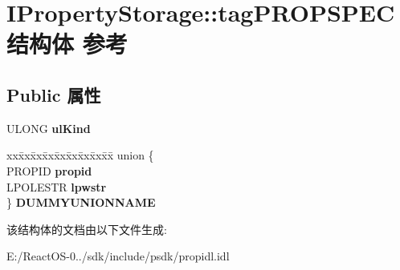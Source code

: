 \hypertarget{struct_i_property_storage_1_1tag_p_r_o_p_s_p_e_c}{}\section{I\+Property\+Storage\+:\+:tag\+P\+R\+O\+P\+S\+P\+E\+C结构体 参考}
\label{struct_i_property_storage_1_1tag_p_r_o_p_s_p_e_c}
\subsection*{Public 属性}
\begin{DoxyCompactItemize}
\item 
\mbox{\label{struct_i_property_storage_1_1tag_p_r_o_p_s_p_e_c_af7d621dabc08957c8ede467b15adbabd}} 
U\+L\+O\+NG {\bfseries ul\+Kind}
\item 
\mbox{\label{struct_i_property_storage_1_1tag_p_r_o_p_s_p_e_c_a170b2c622ae165bdbeafeb799b013fd8}} 
\begin{tabbing}
xx\=xx\=xx\=xx\=xx\=xx\=xx\=xx\=xx\=\kill
union \{\\
\>PROPID {\bfseries propid}\\
\>LPOLESTR {\bfseries lpwstr}\\
\} {\bfseries DUMMYUNIONNAME}\\

\end{tabbing}\end{DoxyCompactItemize}


该结构体的文档由以下文件生成\+:\begin{DoxyCompactItemize}
\item 
E\+:/\+React\+O\+S-\/0../sdk/include/psdk/propidl.\+idl\end{DoxyCompactItemize}
